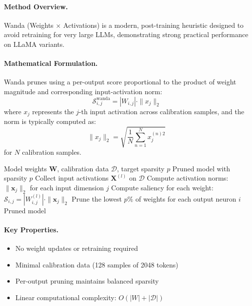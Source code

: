 \paragraph{Method Overview.} Wanda (Weights $\times$ Activations) \cite{sun2023simple} is a modern, post-training heuristic designed to avoid retraining for very large LLMs, demonstrating strong practical performance on LLaMA variants.

\paragraph{Mathematical Formulation.}
Wanda prunes using a per-output score proportional to the product of weight magnitude and corresponding input-activation norm:
\begin{equation}
	\mathcal{S}^{\mathrm{wanda}}_{i,j} = |W_{i,j}| \cdot \|x_{j}\|_2
\end{equation}
where $x_j$ represents the $j$-th input activation across calibration samples, and the norm is typically computed as:
\begin{equation}
	\|x_{j}\|_2 = \sqrt{\frac{1}{N}\sum_{n=1}^N x_j^{(n)2}}
\end{equation}
for $N$ calibration samples.

\begin{algorithm}[H]
	\caption{Wanda Pruning}
	\begin{algorithmic}[1]
		\REQUIRE Model weights $\mathbf{W}$, calibration data $\mathcal{D}$, target sparsity $p$
		\ENSURE Pruned model with sparsity $p$
		\STATE Collect input activations $\mathbf{X}^{(l)}$ on $\mathcal{D}$
		\STATE Compute activation norms: $\|\mathbf{x}_j\|_2$ for each input dimension $j$
		\STATE Compute saliency for each weight: $\mathcal{S}_{i,j} = |W_{i,j}^{(l)}| \cdot \|\mathbf{x}_j\|_2$
		\STATE Prune the lowest $p\%$ of weights for each output neuron $i$
		\ENDFOR
		\RETURN Pruned model
	\end{algorithmic}
\end{algorithm}

\paragraph{Key Properties.}
\begin{itemize}[nosep]
	\item No weight updates or retraining required
	\item Minimal calibration data (128 samples of 2048 tokens)
	\item Per-output pruning maintains balanced sparsity
	\item Linear computational complexity: $O(|W| + |\mathcal{D}|)$
\end{itemize}

